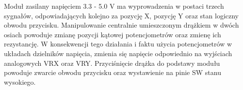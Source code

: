\documentclass[11pt, a4paper]{article}
\begin{document}
Moduł zasilany napięciem 3.3 - 5.0 V ma wyprowadzenia w postaci trzech sygnałów, odpowiadających kolejno za pozycję X, pozycję Y oraz stan logiczny obwodu przycisku. Manipulowanie centralnie umieszczonym drążkiem w dwóch osiach powoduje zmianę pozycji kątowej potencjometrów oraz zmienę ich rezystancję. W konsekwencji tego działania i faktu użycia potencjometrów w układach dzielników napięcia, zmienia się napięcie odpowiednio na wyjściach analogowych VRX oraz VRY. Przyciśnięcie drążka do podstawy modułu powoduje zwarcie obwodu przycisku oraz wystawienie na pinie SW stanu wysokiego.
\vspace{0.75cm}
\end{document}
